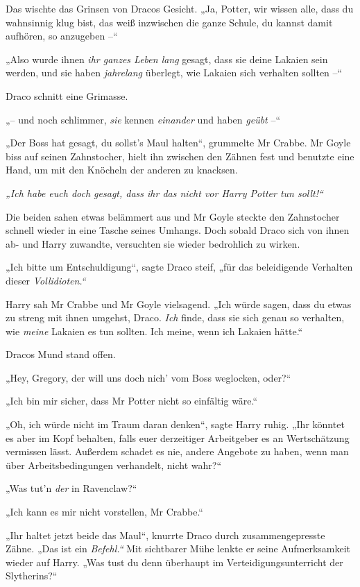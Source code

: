 {Das wischte das Grinsen von Dracos Gesicht. „Ja, Potter, wir wissen alle, dass du wahnsinnig klug bist, das weiß inzwischen die ganze Schule, du kannst damit aufhören, so anzugeben --“

„Also wurde ihnen \emph{ihr ganzes Leben lang} gesagt, dass sie deine Lakaien sein werden, und sie haben \emph{jahrelang} überlegt, wie Lakaien sich verhalten sollten --“

Draco schnitt eine Grimasse.

„-- und noch schlimmer, \emph{sie} kennen \emph{einander} und haben \emph{geübt} --“

„Der Boss hat gesagt, du sollst's Maul halten“, grummelte Mr Crabbe. Mr Goyle biss auf seinen Zahnstocher, hielt ihn zwischen den Zähnen fest und benutzte eine Hand, um mit den Knöcheln der anderen zu knacksen.

\emph{„Ich habe euch doch gesagt, dass ihr das nicht vor Harry Potter tun sollt!“}

Die beiden sahen etwas belämmert aus und Mr Goyle steckte den Zahnstocher schnell wieder in eine Tasche seines Umhangs. Doch sobald Draco sich von ihnen ab- und Harry zuwandte, versuchten sie wieder bedrohlich zu wirken.

„Ich bitte um Entschuldigung“, sagte Draco steif, „für das beleidigende Verhalten dieser \emph{Vollidioten.“}

Harry sah Mr Crabbe und Mr Goyle vielsagend. „Ich würde sagen, dass du etwas zu streng mit ihnen umgehst, Draco. \emph{Ich} finde, dass sie sich genau so verhalten, wie \emph{meine} Lakaien es tun sollten. Ich meine, wenn ich Lakaien hätte.“

Dracos Mund stand offen.

„Hey, Gregory, der will uns doch nich' vom Boss weglocken, oder?“

„Ich bin mir sicher, dass Mr Potter nicht so einfältig wäre.“

„Oh, ich würde nicht im Traum daran denken“, sagte Harry ruhig. „Ihr könntet es aber im Kopf behalten, falls euer derzeitiger Arbeitgeber es an Wertschätzung vermissen lässt. Außerdem schadet es nie, andere Angebote zu haben, wenn man über Arbeitsbedingungen verhandelt, nicht wahr?“

„Was tut'n \emph{der} in Ravenclaw?“

„Ich kann es mir nicht vorstellen, Mr Crabbe.“

„Ihr haltet jetzt beide das Maul“, knurrte Draco durch zusammengepresste Zähne. „Das ist ein \emph{Befehl.“} Mit sichtbarer Mühe lenkte er seine Aufmerksamkeit wieder auf Harry. „Was tust du denn überhaupt im Verteidigungsunterricht der Slytherins?“

}
